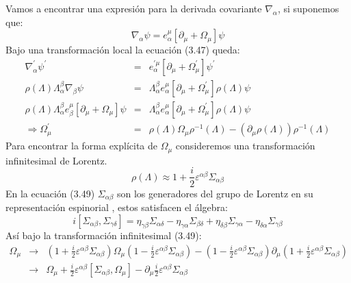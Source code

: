 Vamos a encontrar una expresión para la derivada covariante $\nabla_\alpha$, si suponemos que:
\begin{equation}
\nabla_{\alpha}\psi=e_{\alpha}^{\mu}[\partial_{\mu}+\Omega_{\mu}]\psi
\end{equation}
Bajo una transformación local la ecuación (3.47) queda:
\begin{eqnarray}
\nonumber \nabla_{\alpha}^{\prime}\psi^{\prime}&=& e_{\alpha}^{\prime\mu}[\partial_{\mu}+\Omega_{\mu}^{\prime}]\psi^{\prime}\\
\nonumber  \rho(\Lambda)\Lambda_{\alpha}^{\beta}\nabla_{\beta}\psi &=&\Lambda_{\alpha}^{\beta}e_{\alpha}^{\mu}[\partial_{\mu}+\Omega_{\mu}^{\prime}]\rho(\Lambda)\psi\\
\nonumber \rho(\Lambda)\Lambda_{\alpha}^{\beta}e_{\beta}^{\mu}[\partial_{\mu}+\Omega_{\mu}]\psi &=& \Lambda_{\alpha}^{\beta}e_{\alpha}^{\mu}[\partial_{\mu}+\Omega_{\mu}^{\prime}]\rho(\Lambda)\psi\\
\Rightarrow\Omega_{\mu}^{\prime}&=&\rho(\Lambda)\Omega_{\mu}\rho^{-1}(\Lambda)-(\partial_{\mu}\rho(\Lambda))\rho^{-1}(\Lambda)
\end{eqnarray}
Para encontrar la forma explícita de $\Omega_\mu$ consideremos una transformación infinitesimal de Lorentz.
\begin{equation}
\rho(\Lambda)\approx1+\frac{i}{2}\varepsilon^{\alpha\beta}\Sigma_{\alpha\beta}
\end{equation} 
En la ecuación (3.49) $\Sigma_{\alpha\beta}$ son los generadores del grupo de Lorentz en su representación espinorial , estos satisfacen el álgebra:
\begin{equation}
i[\Sigma_{\alpha\beta},\Sigma_{\gamma\delta}]=\eta_{\gamma\beta}\Sigma_{\alpha\delta}-\eta_{\gamma\alpha}\Sigma_{\beta\delta}+\eta_{\delta\beta}\Sigma_{\gamma\alpha}-\eta_{\delta\alpha}\Sigma_{\gamma\beta}
\end{equation}
Así bajo la transformación infinitesimal (3.49):
\begin{eqnarray}
\nonumber \Omega_{\mu}&\to &\left(1+\frac{i}{2}\varepsilon^{\alpha\beta}\Sigma_{\alpha\beta}\right)\Omega_{\mu}\left(1-\frac{i}{2}\varepsilon^{\alpha\beta}\Sigma_{\alpha\beta}\right)-\left(1-\frac{i}{2}\varepsilon^{\alpha\beta}\Sigma_{\alpha\beta}\right)\partial_{\mu}\left(1+\frac{i}{2}\varepsilon^{\alpha\beta}\Sigma_{\alpha\beta}\right)\\
&\to &\Omega_{\mu}+\frac{i}{2}\varepsilon^{\alpha\beta}[\Sigma_{\alpha\beta},\Omega_{\mu}]-\partial_{\mu}\frac{i}{2}\varepsilon^{\alpha\beta}\Sigma_{\alpha\beta}
\end{eqnarray}
